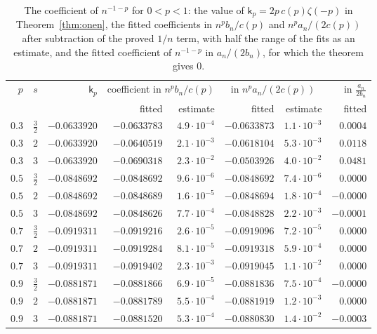 \begin{table}[ht]
\centering
\small
\begin{tabular}{rrrrrrrr}
\toprule
$p$ & $s$ & $\mathsf k_p$ & \multicolumn{2}{c}{coefficient in $n^pb_n/c(p)$} & \multicolumn{2}{c}{in $n^pa_n/(2c(p))$} &
in $\frac{a_n}{2b_n}$\\
\cmidrule(lr){4-5}\cmidrule(lr){6-7}
 & & & fitted & estimate & fitted & estimate & fitted\\
\midrule
$0.3$ & $\frac32$ & $-0.0633920$ & $-0.0633783$ & $4.9\cdot10^{-4}$ & $-0.0633873$ & $1.1\cdot10^{-3}$ & $0.0004$\\
$0.3$ & $2$ & $-0.0633920$ & $-0.0640519$ & $2.1\cdot10^{-3}$ & $-0.0618104$ & $5.3\cdot10^{-3}$ & $0.0118$\\
$0.3$ & $3$ & $-0.0633920$ & $-0.0690318$ & $2.3\cdot10^{-2}$ & $-0.0503926$ & $4.0\cdot10^{-2}$ & $0.0481$\\
$0.5$ & $\frac32$ & $-0.0848692$ & $-0.0848692$ & $9.6\cdot10^{-6}$ & $-0.0848692$ & $7.4\cdot10^{-6}$ & $0.0000$\\
$0.5$ & $2$ & $-0.0848692$ & $-0.0848689$ & $1.6\cdot10^{-5}$ & $-0.0848694$ & $1.8\cdot10^{-4}$ & $-0.0000$\\
$0.5$ & $3$ & $-0.0848692$ & $-0.0848626$ & $7.7\cdot10^{-4}$ & $-0.0848828$ & $2.2\cdot10^{-3}$ & $-0.0001$\\
$0.7$ & $\frac32$ & $-0.0919311$ & $-0.0919216$ & $2.6\cdot10^{-5}$ & $-0.0919096$ & $7.2\cdot10^{-5}$ & $0.0000$\\
$0.7$ & $2$ & $-0.0919311$ & $-0.0919284$ & $8.1\cdot10^{-5}$ & $-0.0919318$ & $5.9\cdot10^{-4}$ & $0.0000$\\
$0.7$ & $3$ & $-0.0919311$ & $-0.0919402$ & $2.3\cdot10^{-3}$ & $-0.0919045$ & $1.1\cdot10^{-2}$ & $0.0000$\\
$0.9$ & $\frac32$ & $-0.0881871$ & $-0.0881866$ & $6.9\cdot10^{-5}$ & $-0.0881836$ & $7.5\cdot10^{-4}$ & $-0.0000$\\
$0.9$ & $2$ & $-0.0881871$ & $-0.0881789$ & $5.5\cdot10^{-4}$ & $-0.0881919$ & $1.2\cdot10^{-3}$ & $0.0000$\\
$0.9$ & $3$ & $-0.0881871$ & $-0.0881520$ & $5.3\cdot10^{-4}$ & $-0.0880830$ & $1.4\cdot10^{-2}$ & $-0.0003$\\
\bottomrule
\end{tabular}
\caption{The coefficient of $n^{-1-p}$ for $0<p<1$: the value of $\mathsf k_p=2p\,c(p)\zeta(-p)$ in
Theorem~\ref{thm:onen}, the fitted coefficients in $n^pb_n/c(p)$ and $n^pa_n/(2c(p))$ after subtraction of the proved
$1/n$ term, with half the range of the fits as an estimate, and the fitted coefficient of $n^{-1-p}$ in $a_n/(2b_n)$, for
which the theorem gives $0$.}
\label{tab:plt1}
\end{table}

